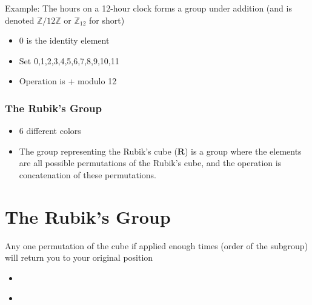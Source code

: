 \documentclass[xcolor=pdftex,dvipsnames,table]{beamer}
\begin{document}
\begin{frame}
  Example: The hours on a 12-hour clock forms a group under addition (and is denoted $ \mathbb{Z} / 12\mathbb{Z}$ or $\mathbb{Z}_{12}$ for short)
  \begin{itemize}
    \item 0 is the identity element
    \item Set {0,1,2,3,4,5,6,7,8,9,10,11}
    \item Operation is + modulo 12
  \end{itemize}
\end{frame}

\begin{frame}
  \frametitle{The Rubik's Group}
  \begin{itemize}
    \item 6 different colors
    \item The group representing the Rubik's cube ($ \mathbf{R} $) is a group where the elements are all possible permutations of the Rubik's cube, and the operation is concatenation of these permutations.
  \end{itemize}
\end{frame}

\section{The Rubik's Group}
\begin{frame}
  Any one permutation of the cube if applied enough times (order of the subgroup) will return you to your original position
  \begin{itemize}
    \item 
  \end{itemize}
\end{frame}

\begin{frame}
  \begin{itemize}
    \item
  \end{itemize}
\end{frame}
\end{document}
